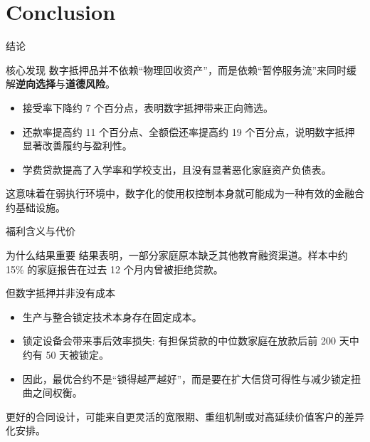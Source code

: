 \section{Conclusion}

\begin{frame}{结论}
  \begin{block}{核心发现}
    数字抵押品并不依赖“物理回收资产”，而是依赖“暂停服务流”来同时缓解\textbf{逆向选择}与\textbf{道德风险}。
  \end{block}

  \begin{itemize}
    \item 接受率下降约 7 个百分点，表明数字抵押带来正向筛选。
    \item 还款率提高约 11 个百分点、全额偿还率提高约 19 个百分点，说明数字抵押显著改善履约与盈利性。
    \item 学费贷款提高了入学率和学校支出，且没有显著恶化家庭资产负债表。
  \end{itemize}

  \scriptsize
  这意味着在弱执行环境中，数字化的使用权控制本身就可能成为一种有效的金融合约基础设施。
\end{frame}

\begin{frame}{福利含义与代价}
  \begin{block}{为什么结果重要}
    结果表明，一部分家庭原本缺乏其他教育融资渠道。样本中约 15\% 的家庭报告在过去 12 个月内曾被拒绝贷款。
  \end{block}

  \begin{block}{但数字抵押并非没有成本}
    \begin{itemize}
      \item 生产与整合锁定技术本身存在固定成本。
      \item 锁定设备会带来事后效率损失: 有担保贷款的中位数家庭在放款后前 200 天中约有 50 天被锁定。
      \item 因此，最优合约不是“锁得越严越好”，而是要在扩大信贷可得性与减少锁定扭曲之间权衡。
    \end{itemize}
  \end{block}

  \scriptsize
  更好的合同设计，可能来自更灵活的宽限期、重组机制或对高延续价值客户的差异化安排。
\end{frame}
